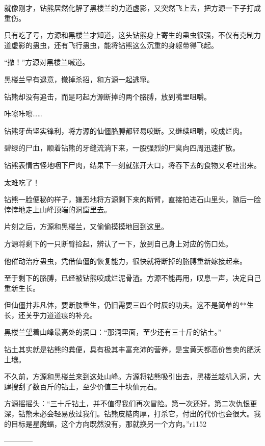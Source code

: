 \begin{this_body}
就像刚才，钻熊居然化解了黑楼兰的力道虚影，又突然飞上去，把方源一下子打成重伤。

只有吃了亏，方源和黑楼兰才知道，这头钻熊身上寄生的蛊虫很强，不仅有克制力道虚影的蛊虫，还有飞行蛊虫，能将钻熊这么沉重的身躯带得飞起。

“撤！”方源对黑楼兰喊道。

黑楼兰早有退意，撤掉杀招，和方源一起逃窜。

钻熊却没有追击，而是叼起方源断掉的两个胳膊，放到嘴里咀嚼。

咔嚓咔嚓……

钻熊牙齿坚实锋利，将方源的仙僵胳膊都轻易咬断。又继续咀嚼，咬成烂肉。

碧绿的尸血，顺着钻熊的牙缝流淌下来，一股强烈的尸臭向四周迅速扩散。

钻熊表情古怪地咽下尸肉，结果下一刻就张开大口，将吞下去的食物又呕吐出来。

太难吃了！

钻熊一脸便秘的样子，嫌恶地将方源剩下来的断臂，直接拍进石山里头，随后一脸悻悻地走上山峰顶端的洞窟里去。

片刻之后，方源和黑楼兰，又偷偷摸摸地回到这里。

方源将剩下的一只断臂捡起，辨认了一下，放到自己身上对应的伤口处。

他催动治疗蛊虫，凭借仙僵的恢复能力，很快就将断掉的胳膊重新嫁接起来。

至于剩下的胳膊，已经被钻熊咬成烂泥骨渣。方源不能再用，叹息一声，决定自己重新生长。

但仙僵并非凡体，要断肢重生，仍旧需要三四个时辰的功夫。这不是简单的**生长，还关乎力道道痕的补充。

黑楼兰望着山峰最高处的洞口：“那洞里面，至少还有三十斤的钻土。”

钻土其实就是钻熊的粪便，具有极其丰富充沛的营养，是宝黄天都高价售卖的肥沃土壤。

不久前，方源和黑楼兰来到这处山峰。方源将钻熊吸引出去，黑楼兰趁机入洞，大肆搜刮了数百斤的钻土，至少价值三十块仙元石。

方源摇摇头：“三十斤钻土，并不值得我们再次冒险。第一次还好，第二次仇恨更深，钻熊未必会轻易放过我们。钻熊皮糙肉厚，打杀它，付出的代价也会很大。我的目标是星魔蝠，这个方向既然没有，那就换另一个方向。”r1152

------------

\end{this_body}

